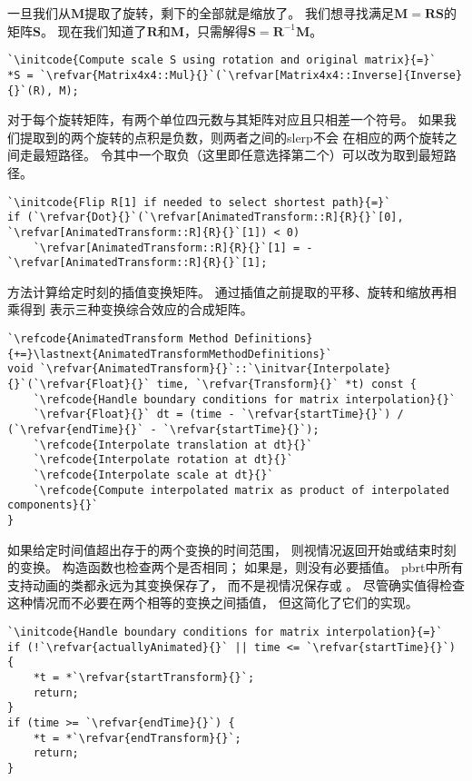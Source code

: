 一旦我们从$\bm M$提取了旋转，剩下的全部就是缩放了。
我们想寻找满足$\bm M=\bm R\bm S$的矩阵$\bm S$。
现在我们知道了$\bm R$和$\bm M$，只需解得$\bm S=\bm R^{-1}\bm M$。
\begin{lstlisting}
`\initcode{Compute scale S using rotation and original matrix}{=}`
*S = `\refvar{Matrix4x4::Mul}{}`(`\refvar[Matrix4x4::Inverse]{Inverse}{}`(R), M);
\end{lstlisting}

对于每个旋转矩阵，有两个单位四元数与其矩阵对应且只相差一个符号。
如果我们提取到的两个旋转的点积是负数，则两者之间的slerp不会
在相应的两个旋转之间走最短路径。
令其中一个取负（这里即任意选择第二个）可以改为取到最短路径。
\begin{lstlisting}
`\initcode{Flip R[1] if needed to select shortest path}{=}`
if (`\refvar{Dot}{}`(`\refvar[AnimatedTransform::R]{R}{}`[0], `\refvar[AnimatedTransform::R]{R}{}`[1]) < 0)
    `\refvar[AnimatedTransform::R]{R}{}`[1] = -`\refvar[AnimatedTransform::R]{R}{}`[1];
\end{lstlisting}

方法计算给定时刻的插值变换矩阵。
通过插值之前提取的平移、旋转和缩放再相乘得到
表示三种变换综合效应的合成矩阵。
\begin{lstlisting}
`\refcode{AnimatedTransform Method Definitions}{+=}\lastnext{AnimatedTransformMethodDefinitions}`
void `\refvar{AnimatedTransform}{}`::`\initvar{Interpolate}{}`(`\refvar{Float}{}` time, `\refvar{Transform}{}` *t) const {
    `\refcode{Handle boundary conditions for matrix interpolation}{}`
    `\refvar{Float}{}` dt = (time - `\refvar{startTime}{}`) / (`\refvar{endTime}{}` - `\refvar{startTime}{}`);
    `\refcode{Interpolate translation at dt}{}`
    `\refcode{Interpolate rotation at dt}{}`
    `\refcode{Interpolate scale at dt}{}`
    `\refcode{Compute interpolated matrix as product of interpolated components}{}`
}
\end{lstlisting}

如果给定时间值超出存于的两个变换的时间范围，
则视情况返回开始或结束时刻的变换。
构造函数也检查两个是否相同；
如果是，则没有必要插值。
pbrt中所有支持动画的类都永远为其变换保存了，
而不是视情况保存或
。
尽管确实值得检查这种情况而不必要在两个相等的变换之间插值，
但这简化了它们的实现。
\begin{lstlisting}
`\initcode{Handle boundary conditions for matrix interpolation}{=}`
if (!`\refvar{actuallyAnimated}{}` || time <= `\refvar{startTime}{}`) { 
    *t = *`\refvar{startTransform}{}`;
    return; 
}
if (time >= `\refvar{endTime}{}`) { 
    *t = *`\refvar{endTransform}{}`;
    return; 
}
\end{lstlisting}

